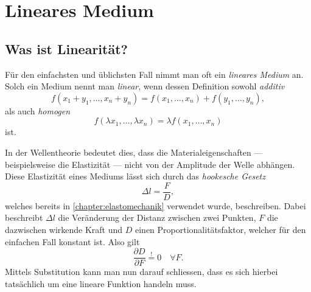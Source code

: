 %
%
%
%
\section{Lineares Medium\label{particles:section:linear}}

\subsection{Was ist Linearität?}
Für den einfachsten und üblichsten Fall nimmt man oft ein \emph{lineares Medium} an.
Solch ein Medium nennt man \emph{linear}, wenn dessen Definition sowohl \emph{additiv}
\[
    f(x_{1} + y_{1}, \ldots, x_{n} + y_{n}) 
    = 
    f(x_{1}, \ldots, x_{n}) 
    + 
    f(y_{1}, \ldots, y_{n}),
\]
als auch \emph{homogen}
\[
    f(\lambda x_{1}, \ldots, \lambda x_{n}) 
    = 
    \lambda f(x_{1}, \ldots, x_{n})
\]
ist.

In der Wellentheorie bedeutet dies, 
dass die Materialeigenschaften --- beispielsweise die Elastizität --- nicht von der Amplitude der Welle abhängen.
Diese Elastizität eines Mediums lässt sich durch das \emph{hookesche Gesetz}
\[
    \Delta l
    = 
    \frac{F}{D}
    \label{particles:eq:hookesches-gesetz},
\]
welches bereits in \autoref{chapter:elastomechanik} verwendet wurde, beschreiben.
Dabei beschreibt $\Delta l$ die Veränderung der Distanz zwischen zwei Punkten,
$F$ die dazwischen wirkende Kraft und $D$ einen Proportionalitätsfaktor, 
welcher für den einfachen Fall konstant ist. Also gilt 
\[
    \frac{\partial D}{\partial F} 
    \overset{!}{=} 
    0 
    \quad 
    \forall F.
\]
Mittels Substitution kann man nun darauf schliessen, 
dass es sich hierbei tatsächlich um eine lineare Funktion handeln muss.

